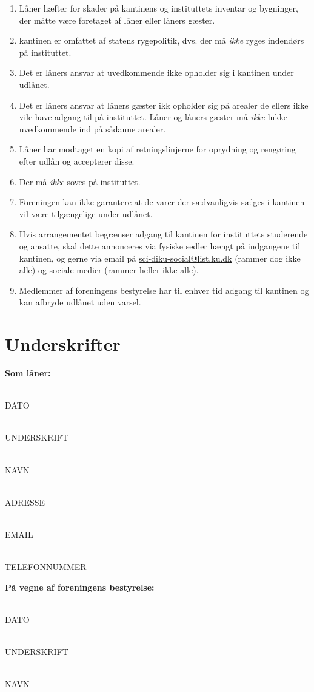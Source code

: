 \documentclass[a4paper]{article}
\begin{document}
\begin{enumerate}
\item Låner hæfter for skader på kantinens og instituttets inventar og
bygninger, der måtte være foretaget af låner eller låners gæster.
\item kantinen er omfattet af statens rygepolitik, dvs. der må \emph{ikke} ryges
indendørs på instituttet.
\item Det er låners ansvar at uvedkommende ikke opholder sig i kantinen under
udlånet.
\item Det er låners ansvar at låners gæster ikk opholder sig på arealer de
ellers ikke vile have adgang til på instituttet.  Låner og låners gæster må
\emph{ikke} lukke uvedkommende ind på sådanne arealer.
\item Låner har modtaget en kopi af retningslinjerne for oprydning og rengøring
efter udlån og accepterer disse.
\item Der må \emph{ikke} soves på instituttet.
\item Foreningen kan ikke garantere at de varer der sædvanligvis sælges i
kantinen vil være tilgængelige under udlånet.
\item Hvis arrangementet begrænser adgang til kantinen for instituttets
studerende og ansatte, skal dette annonceres via fysiske sedler hængt på
indgangene til kantinen, og gerne via email på \url{sci-diku-social@list.ku.dk}
(rammer dog ikke alle) og sociale medier (rammer heller ikke alle).
\item Medlemmer af foreningens bestyrelse har til enhver tid adgang til
kantinen og kan afbryde udlånet uden varsel.
\end{enumerate}

\section{Underskrifter}


\begin{multicols}{2}
\textbf{Som låner:}

\newcommand{\skrivher}[1]{\underline{\hspace{7.5cm}}\\[-1mm]{\scriptsize #1}}

\skrivher{DATO}

\skrivher{UNDERSKRIFT}

\skrivher{NAVN}

\skrivher{ADRESSE}

\skrivher{EMAIL}

\skrivher{TELEFONNUMMER}

\columnbreak

\textbf{På vegne af foreningens bestyrelse:}

\skrivher{DATO}

\skrivher{UNDERSKRIFT}

\skrivher{NAVN}

\end{multicols}
\end{document}
